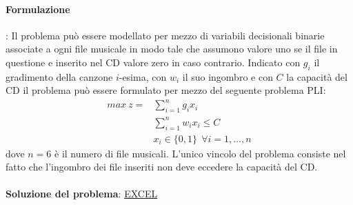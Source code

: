 \documentclass[12pt,a4paper]{article}
\begin{document}
\paragraph{Formulazione}: Il problema può essere modellato per mezzo di variabili decisionali binarie associate a ogni file musicale in modo tale che assumono valore uno se il file in questione e inserito nel CD valore zero in caso contrario.
Indicato con $g_i$ il gradimento della canzone $i$-esima, con $w_i$ il suo ingombro e con $C$ la capacità del CD il problema può essere formulato per mezzo del seguente problema PLI:
$$\begin{array}{cl}
max \ z = & \sum_{i=1}^n g_ix_i\\
& \sum_{i=1}^n w_ix_i \leq C\\
& x_i \in \{0,1\} \ \ \forall i = 1, \dots, n
\end{array}$$
dove $n = 6$ è il numero di file musicali. L’unico vincolo del problema consiste nel fatto che l’ingombro dei file inseriti non deve eccedere la capacità del CD.\\
\\
\textbf{Soluzione del problema}: \href{https://units.enricolacchin.com/ricop21/problema_dello_zaino.xlsx}{EXCEL}
\end{document}
